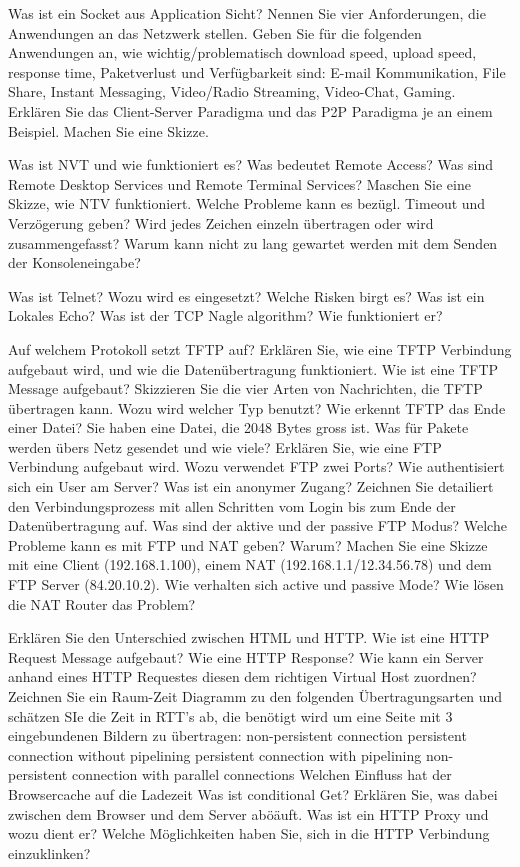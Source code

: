 \documentclass[ngerman,a4paper,12pt]{scrreprt}
\begin{document}
\olR
	\li Was ist ein Socket aus Application Sicht?
	\li Nennen Sie vier Anforderungen, die Anwendungen an das Netzwerk stellen.
	\li Geben Sie für die folgenden Anwendungen an, wie wichtig/problematisch download speed, upload speed, response time, Paketverlust und Verfügbarkeit sind: E-mail Kommunikation, File Share, Instant Messaging, Video/Radio Streaming, Video-Chat, Gaming.
	\li Erklären Sie das Client-Server Paradigma und das P2P Paradigma je an einem Beispiel. Machen Sie eine Skizze.
\olS

\olR
	\li Was ist NVT und wie funktioniert es? 
	\li Was bedeutet Remote Access?
	\li Was sind Remote Desktop Services und Remote Terminal Services?
	\li Maschen Sie eine Skizze, wie NTV funktioniert. Welche Probleme kann es bezügl. Timeout und Verzögerung geben? Wird jedes Zeichen einzeln übertragen oder wird zusammengefasst? Warum kann nicht zu lang gewartet werden mit dem Senden der Konsoleneingabe?
\olS

\olR
	\li Was ist Telnet? Wozu wird es eingesetzt? Welche Risken birgt es?
	\li Was ist ein Lokales Echo?
	\li Was ist der TCP Nagle algorithm? Wie funktioniert er?
\olS

\olR
	\li Auf welchem Protokoll setzt TFTP auf?
	\li Erklären Sie, wie eine TFTP Verbindung aufgebaut wird, und wie die Datenübertragung funktioniert.
	\li Wie ist eine TFTP Message aufgebaut? Skizzieren Sie die vier Arten von Nachrichten, die TFTP übertragen kann. Wozu wird welcher Typ benutzt?
	\li Wie erkennt TFTP das Ende einer Datei?
	\li Sie haben eine Datei, die 2048 Bytes gross ist. Was für Pakete werden übers Netz gesendet und wie viele?
	\li Erklären Sie, wie eine FTP Verbindung aufgebaut wird. Wozu verwendet FTP zwei Ports?
	\li Wie authentisiert sich ein User am Server? Was ist ein anonymer Zugang?
	\li Zeichnen Sie detailiert den Verbindungsprozess mit allen Schritten vom Login bis zum Ende der Datenübertragung auf.
	\li Was sind der aktive und der passive FTP Modus?
	\li Welche Probleme kann es mit FTP und NAT geben? Warum? Machen Sie eine Skizze mit eine Client (192.168.1.100), einem NAT (192.168.1.1/12.34.56.78) und dem FTP Server (84.20.10.2). Wie verhalten sich active und passive Mode? Wie lösen die NAT Router das Problem?
\olS

\olR
	\li Erklären Sie den Unterschied zwischen HTML und HTTP.
	\li Wie ist eine HTTP Request Message aufgebaut? Wie eine HTTP Response?
	\li Wie kann ein Server anhand eines HTTP Requestes diesen dem richtigen Virtual Host zuordnen?
	\li Zeichnen Sie ein Raum-Zeit Diagramm zu den folgenden Übertragungsarten und schätzen SIe die Zeit in RTT's ab, die benötigt wird um eine Seite mit 3 eingebundenen Bildern zu übertragen:
		\ol
			\li non-persistent connection
			\li persistent connection without pipelining
			\li persistent connection with pipelining
			\li non-persistent connection with parallel connections
		\olE
	\li Welchen Einfluss hat der Browsercache auf die Ladezeit
	\li Was ist conditional Get? Erklären Sie, was dabei zwischen dem Browser und dem Server aböäuft.
	\li Was ist ein HTTP Proxy und wozu dient er?
	\li Welche Möglichkeiten haben Sie, sich in die HTTP Verbindung einzuklinken?
\olE
\end{document}
